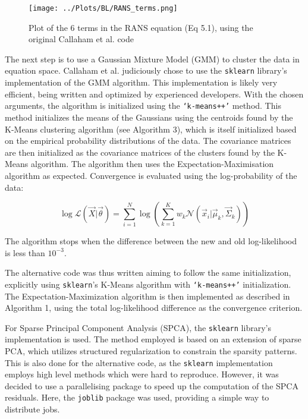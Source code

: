 \documentclass[12pt]{report} %
\begin{document}
\begin{figure}
  \centering
  \texttt{[image: ../Plots/BL/RANS\_terms.png]}
  \caption{Plot of the 6 terms in the RANS equation (Eq 5.1), using the original Callaham et al. code}
  \label{fig:RANS_terms}
\end{figure}

\vspace{5mm}

The next step is to use a Gaussian Mixture Model (GMM) to cluster the data in equation space. Callaham et al. judiciously chose to use the \texttt{sklearn} library’s implementation of the GMM algorithm. This implementation is likely very efficient, being written and optimized by experienced developers. With the chosen arguments, the algorithm is initialized using the \texttt{‘k-means++’} method. This method initializes the means of the Gaussians using the centroids found by the K-Means clustering algorithm (see Algorithm 3), which is itself initialized based on the empirical probability distributions of the data\cite{arthur2007kmeans}. The covariance matrices are then initialized as the covariance matrices of the clusters found by the K-Means algorithm. The algorithm then uses the Expectation-Maximisation algorithm as expected. Convergence is evaluated using the log-probability of the data:

\begin{equation}
  \log \mathcal{L}(\vec{X} | \vec{\theta}) = \sum_{i=1}^{N} \log \left( \sum_{k=1}^{K} w_k \mathcal{N}(\vec{x}_i | \vec{\mu}_k, \vec{\Sigma}_k) \right)
\end{equation}

The algorithm stops when the difference between the new and old log-likelihood is less than $10^{-3}$.

The alternative code was thus written aiming to follow the same initialization, explicitly using \texttt{sklearn}’s K-Means algorithm with \texttt{‘k-means++’} initialization. The Expectation-Maximization algorithm is then implemented as described in Algorithm 1, using the total log-likelihood difference as the convergence criterion.

For Sparse Principal Component Analysis (SPCA), the \texttt{sklearn} library’s implementation is used. The method employed is based on an extension of sparse PCA, which utilizes structured regularization to constrain the sparsity patterns. This is also done for the alternative code, as the \texttt{sklearn} implementation employs high level methods which were hard to reproduce\cite{jenatton2010structured,mairal2010online}. However, it was decided to use a parallelising package to speed up the computation of the SPCA residuals. Here, the \texttt{joblib} package was used, providing a simple way to distribute jobs\cite{joblib}.
\end{document}
